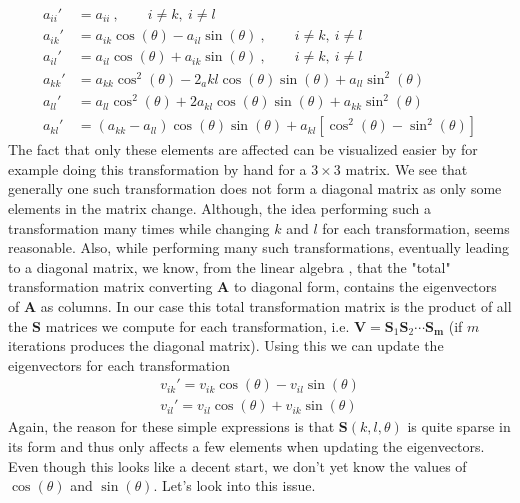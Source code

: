 \documentclass[12pt]{article}
\numberwithin{figure}{section}
\numberwithin{table}{section}
\begin{document}
\begin{align}
	a_{ii}'&=a_{ii} \ , \qquad i\neq k, \ i\neq l \nonumber \\
    a_{ik}'&=a_{ik}\cos(\theta)-a_{il}\sin(\theta) \ , \qquad i\neq k, \ i\neq l \nonumber  \\
    a_{il}'&=a_{il}\cos(\theta)+a_{ik}\sin(\theta) \ , \qquad i\neq k, \ i\neq l \nonumber  \\
    a_{kk}'&=a_{kk}\cos^2(\theta)-2_a{kl}\cos(\theta)\sin(\theta)+a_{ll}\sin^2(\theta) \label{eq:bikl}\\
    a_{ll}'&=a_{ll}\cos^2(\theta)+2a_{kl}\cos(\theta)\sin(\theta)+a_{kk}\sin^2(\theta) \nonumber \\
    a_{kl}'&=(a_{kk}-a_{ll})\cos(\theta)\sin(\theta)+a_{kl}\left[\cos^2(\theta)-\sin^2(\theta)\right] \nonumber 
\end{align}
The fact that only these elements are affected can be visualized easier by for example doing this transformation by hand for a $3\times 3$ matrix. We see that generally one such transformation does not form a diagonal matrix as only some elements in the matrix change. Although, the idea performing such a transformation many times while changing $k$ and $l$ for each transformation, seems reasonable. Also, while performing many such transformations, eventually leading to a diagonal matrix, we know, from the linear algebra \cite{LinAlg}, that the "total" transformation matrix converting $\mathbf{A}$ to diagonal form, contains the eigenvectors of $\mathbf{A}$ as columns. In our case this total transformation matrix is the product of all the $\mathbf{S}$ matrices we compute for each transformation, i.e. $\mathbf{V}=\mathbf{S}_1\mathbf{S}_2\cdots\mathbf{S_m}$ (if $m$ iterations produces the diagonal matrix). Using this we can update the eigenvectors for each transformation \cite{Comp}
\begin{align}
	v_{ik}'=v_{ik}\cos(\theta)-v_{il}\sin(\theta) \label{eq:eigvec_1}\\
    v_{il}'=v_{il}\cos(\theta)+v_{ik}\sin(\theta) \label{eq:eigvec_2}
\end{align}
Again, the reason for these simple expressions is that $\mathbf{S}(k,l,\theta)$ is quite sparse in its form and thus only affects a few elements when updating the eigenvectors. Even though this looks like a decent start, we don't yet know the values of $\cos(\theta)$ and $\sin(\theta)$. Let's look into this issue. \\
\end{document}

